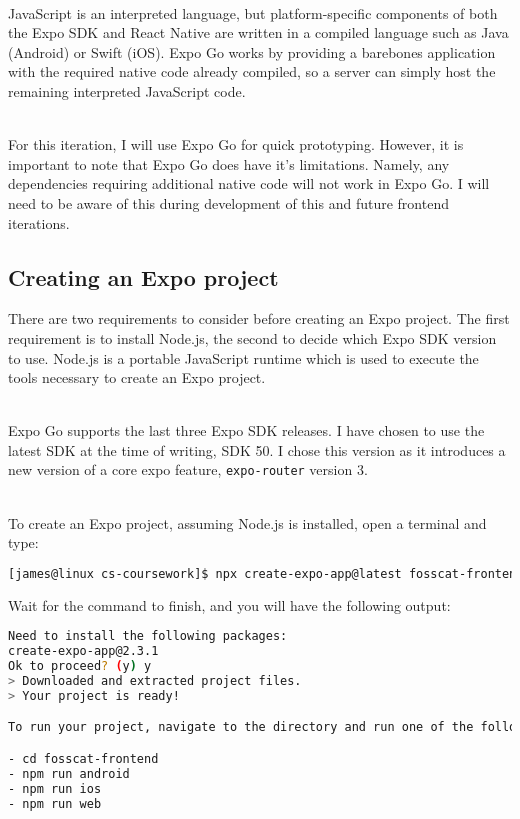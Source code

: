 \documentclass[../../main.tex]{subfiles}
\begin{document}
\noindent \\ JavaScript is an interpreted language, but platform-specific components of both
the Expo SDK and React Native are written in a compiled language such as Java (Android) or Swift (iOS).
Expo Go works by providing a barebones application with the required native code already compiled,
so a server can simply host the remaining interpreted JavaScript code.

\noindent \\ For this iteration, I will use Expo Go for quick prototyping.
However, it is important to note that Expo Go does have it's limitations.
Namely, any dependencies requiring additional native code will not work in Expo Go.
I will need to be aware of this during development of this and future frontend iterations.

\subsection{Creating an Expo project}

There are two requirements to consider before creating an Expo project.
The first requirement is to install Node.js, the second to decide which Expo SDK version
to use. Node.js is a portable JavaScript runtime which is used to execute the tools necessary
to create an Expo project.

\noindent \\ Expo Go supports the last three Expo SDK releases.
I have chosen to use the latest SDK at the time of writing, SDK 50.
I chose this version as it introduces a new version of a core expo feature,
\lstinline{expo-router} version 3.

\noindent \\ To create an Expo project, assuming Node.js is installed, open a terminal and type:

\begin{lstlisting}[language=bash]
    [james@linux cs-coursework]$ npx create-expo-app@latest fosscat-frontend --template tabs@50
\end{lstlisting}

\noindent Wait for the command to finish, and you will have the following output:

\begin{lstlisting}[language=bash]
Need to install the following packages:
create-expo-app@2.3.1
Ok to proceed? (y) y
> Downloaded and extracted project files.
> Your project is ready!

To run your project, navigate to the directory and run one of the following npm commands.

- cd fosscat-frontend
- npm run android
- npm run ios
- npm run web
\end{lstlisting}
\end{document}
